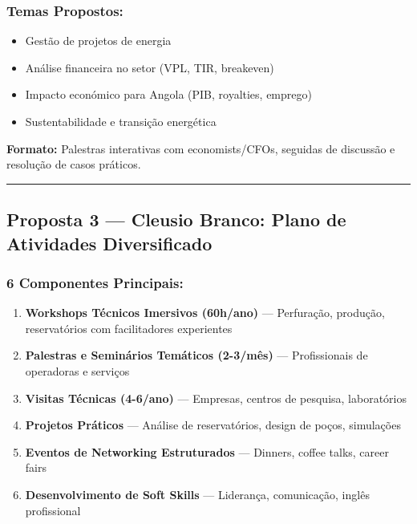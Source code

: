 \documentclass[12pt,a4paper]{article}
\begin{document}
\subsubsection*{Temas Propostos:}
\begin{itemize}[itemsep=0.15cm]
    \item Gestão de projetos de energia
    \item Análise financeira no setor (VPL, TIR, breakeven)
    \item Impacto económico para Angola (PIB, royalties, emprego)
    \item Sustentabilidade e transição energética
\end{itemize}

\textbf{Formato:} Palestras interativas com economists/CFOs, seguidas de discussão e resolução de casos práticos.

\textcolor{spe-secondary}{\hspace{0.5cm}\rule{0.4\linewidth}{0.8pt}}

\subsection{Proposta 3 — Cleusio Branco: Plano de Atividades Diversificado}

\subsubsection*{6 Componentes Principais:}

\begin{enumerate}[itemsep=0.2cm]
    \item \textbf{Workshops Técnicos Imersivos (60h/ano)} — Perfuração, produção, reservatórios com facilitadores experientes
    
    \item \textbf{Palestras e Seminários Temáticos (2-3/mês)} — Profissionais de operadoras e serviços
    
    \item \textbf{Visitas Técnicas (4-6/ano)} — Empresas, centros de pesquisa, laboratórios
    
    \item \textbf{Projetos Práticos} — Análise de reservatórios, design de poços, simulações
    
    \item \textbf{Eventos de Networking Estruturados} — Dinners, coffee talks, career fairs
    
    \item \textbf{Desenvolvimento de Soft Skills} — Liderança, comunicação, inglês profissional
\end{enumerate}
\end{document}

